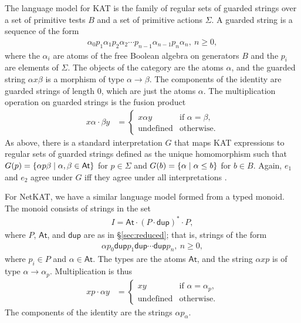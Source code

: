 \documentclass{article}
\newcommand\At{\ensuremath{\mathsf{At}}}
\renewcommand\star{^*}
\newcommand{\netkat}{NetKAT\xspace}
\newcommand{\kw}[1]{\ensuremath{\mathsf{#1}}}
\newcommand{\pdup}{\ensuremath{\mathrel{\kw{dup}}}}
\begin{document}
The language model for KAT is the family of regular sets of guarded strings over a set of primitive tests $B$ and a set of primitive actions $\Sigma$. A guarded string is a sequence of the form\begin{align*}
\alpha_0p_1\alpha_1p_2\alpha_2\cdots p_{n-1}\alpha_{n-1}p_n\alpha_n,\ n\geq 0,
\end{align*}
where the $\alpha_i$ are atoms of the free Boolean algebra on generators $B$ and the $p_i$ are elements of $\Sigma$. The objects of the category are the atoms $\alpha$, and the guarded string $\alpha x\beta$ is a morphism of type $\alpha\to\beta$. The components of the identity are guarded strings of length $0$, which are just the atoms $\alpha$. The multiplication operation on guarded strings is the fusion product
\begin{align*}
x\alpha\cdot\beta y &= \begin{cases}
x\alpha y & \text{if $\alpha=\beta$,}\\
\text{undefined} & \text{otherwise.}
\end{cases}
\end{align*}
As above, there is a standard interpretation $G$ that maps KAT expressions to regular sets of guarded strings defined as the unique homomorphism such that $G(p)=\set{\alpha p\beta}{\alpha,\beta\in\At}$ for $p\in\Sigma$ and $G(b)=\{\alpha \mid \alpha\leq b\}$ for $b\in B$. Again, $e_1$ and $e_2$ agree under $G$ iff they agree under all interpretations \cite{KS96a}.
 
For \netkat, we have a similar language model formed from a typed monoid. The monoid consists of strings in the set
\begin{gather*}
I = \At\cdot (P\cdot\pdup)\star\cdot P,
\end{gather*}
where $P$, $\At$, and $\pdup$ are as in \S\ref{sec:reduced}; that is, strings of the form
\begin{gather*}
\alpha p_0\pdup p_1\pdup\cdots\pdup p_n,\ n\geq 0,
\end{gather*}
where $p_i\in P$ and $\alpha\in\At$. The types are the atoms $\At$, and the string $\alpha x p$ is of type $\alpha\to\alpha_p$. Multiplication is thus
\begin{align*}
x p\cdot\alpha y &= \begin{cases}
xy & \text{if $\alpha=\alpha_p$,}\\
\text{undefined} & \text{otherwise.}
\end{cases}
\end{align*}
The components of the identity are the strings $\alpha p_\alpha$.
\end{document}
